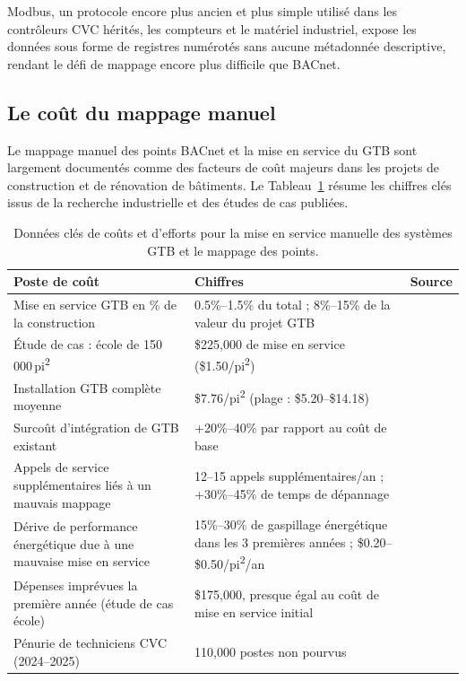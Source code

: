 Modbus, un protocole encore plus ancien et plus simple utilisé dans les contrôleurs CVC hérités, les compteurs et le matériel industriel,
expose les données sous forme de registres numérotés sans aucune métadonnée descriptive, rendant
le défi de mappage encore plus difficile que BACnet.

\subsection{Le coût du mappage manuel}
\label{subsec:cost}

Le mappage manuel des points BACnet et la mise en service du GTB sont largement documentés comme des facteurs de coût majeurs dans
les projets de construction et de rénovation de bâtiments.
Le Tableau~\ref{tab:commissioning-costs} résume les chiffres clés issus de la recherche industrielle et des
études de cas publiées.

\begin{table}[htbp]
\centering
\caption{Données clés de coûts et d'efforts pour la mise en service manuelle des systèmes GTB et le mappage des points.}
\label{tab:commissioning-costs}
\small
\begin{tabular}{p{5.5cm}p{3.5cm}p{4cm}}
\toprule
\textbf{Poste de coût} & \textbf{Chiffres} & \textbf{Source} \\
\midrule
Mise en service GTB en \% de la construction & 0.5\%--1.5\% du total ; 8\%--15\% de la valeur du projet GTB
  & \cite{BCA2024} \\
\addlinespace
Étude de cas : école de 150\,000\,pi\textsuperscript{2}
  & \$225{,}000 de mise en service (\$1.50/pi\textsuperscript{2})
  & \cite{PingCx2024} \\
\addlinespace
Installation GTB complète moyenne
  & \$7.76/pi\textsuperscript{2} (plage : \$5.20--\$14.18)
  & \cite{Trenbath2022} \\
\addlinespace
Surcoût d'intégration de GTB existant
  & +20\%--40\% par rapport au coût de base
  & \cite{Envigilance2023} \\
\addlinespace
Appels de service supplémentaires liés à un mauvais mappage
  & 12--15 appels supplémentaires/an ; +30\%--45\% de temps de dépannage
  & \cite{PingCx2024} \\
\addlinespace
Dérive de performance énergétique due à une mauvaise mise en service
  & 15\%--30\% de gaspillage énergétique dans les 3 premières années ; \$0.20--\$0.50/pi\textsuperscript{2}/an
  & \cite{PingCx2024} \\
\addlinespace
Dépenses imprévues la première année (étude de cas école)
  & \$175{,}000, presque égal au coût de mise en service initial
  & \cite{PingCx2024} \\
\addlinespace
Pénurie de techniciens CVC (2024--2025)
  & 110{,}000 postes non pourvus
  & \cite{AccessCoins2025} \\
\bottomrule
\end{tabular}
\end{table}

